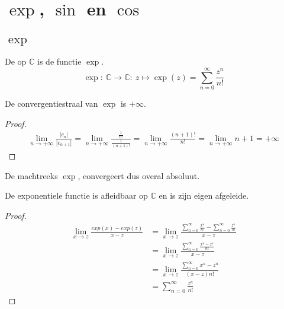 \documentclass[main.tex]{subfiles}
\begin{document}
\section{$\exp$, $\sin$ en $\cos$}
\label{sec:exp-sin-en}

\subsection{$\exp$}
\label{sec:exp}

\begin{de}
  De  op $\mathbb{C}$ is de functie $\exp$.
  \[ \exp:\ \mathbb{C} \rightarrow \mathbb{C}:\ z \mapsto \exp(z) = \sum_{n=0}^{\infty}\frac{z^{n}}{n!} \]
\end{de}

\begin{st}
  De convergentiestraal van $\exp$ is $+\infty$.

  \begin{proof}
    \begin{align*}
      \lim_{n \rightarrow +\infty}\frac{|c_{n}|}{|c_{n+1}|} = \lim_{n
        \rightarrow +\infty}\frac{\frac{1}{n!}}{\frac{1}{(n+1)!}}  =
      \lim_{n \rightarrow +\infty}\frac{(n+1)!}{n!}  = \lim_{n
        \rightarrow +\infty}n+1 = +\infty
    \end{align*}
  \end{proof}
\end{st}

\begin{gev}
  De machtreeks $\exp$, convergeert dus overal absoluut.
\end{gev}

\begin{bst}
  De exponentiele functie is afleidbaar op $\mathbb{C}$ en is zijn eigen afgeleide.

  \begin{proof}
    \begin{align*}
      \lim_{x \rightarrow z}\frac{exp(x)-exp(z)}{x-z}
      &= \lim_{x \rightarrow z}\frac{\sum_{n=0}^{\infty}\frac{x^{n}}{n!}-\sum_{n=0}^{\infty}\frac{z^{n}}{n!}}{x-z}\\
      &= \lim_{x \rightarrow z}\frac{\sum_{n=0}^{\infty}\frac{x^{n}-z^{n}}{n!}}{x-z}\\
      &= \lim_{x \rightarrow z}\frac{\sum_{n=0}^{\infty}x^{n}-z^{n}}{(x-z)n!}\\
      &= \sum_{n=0}^{\infty}\frac{z^{n}}{n!}
    \end{align*}
  \end{proof}
\end{bst}
\end{document}
